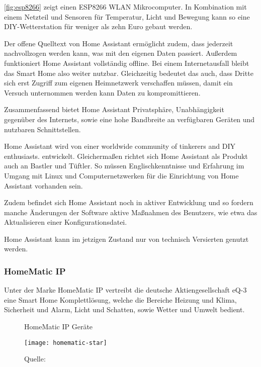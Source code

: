 \autoref{fig:esp8266} zeigt einen ESP8266 WLAN Mikrocomputer.
In Kombination mit einem Netzteil und Sensoren für Temperatur, Licht und Bewegung kann so eine \ac{DIY}-Wetterstation für weniger als zehn Euro gebaut werden.

Der offene Quelltext von Home Assistant ermöglicht zudem, dass jederzeit nachvollzogen werden kann, was mit den eigenen Daten passiert.
Außerdem funktioniert Home Assistant vollständig offline.
Bei einem Internetausfall bleibt das Smart Home also weiter nutzbar.
Gleichzeitig bedeutet das auch, dass Dritte sich erst Zugriff zum eigenen Heimnetzwerk verschaffen müssen, damit ein Versuch unternommen werden kann Daten zu kompromittieren.

Zusammenfassend bietet Home Assistant Privatsphäre, Unabhängigkeit gegenüber des Internets, sowie eine hohe Bandbreite an verfügbaren Geräten und nutzbaren Schnittstellen.

Home Assistant wird von einer \glqq worldwide community of tinkerers and DIY enthusiasts.\grqq{} entwickelt.
Gleichermaßen richtet sich Home Assistant als Produkt auch an Bastler und Tüftler.
So müssen Englischkenntnisse und Erfahrung im Umgang mit Linux und Computernetzwerken für die Einrichtung von Home Assistant vorhanden sein.

Zudem befindet sich Home Assistant noch in aktiver Entwicklung und so fordern manche Änderungen der Software aktive Maßnahmen des Benutzers, wie etwa das Aktualisieren einer Konfigurationsdatei.

Home Assistant kann im jetzigen Zustand nur von technisch Versierten genutzt werden.

\subsubsection{HomeMatic IP}

Unter der Marke HomeMatic IP vertreibt die deutsche Aktiengesellschaft eQ-3 eine Smart Home Komplettlösung, welche die Bereiche Heizung und Klima, Sicherheit und Alarm, Licht und Schatten, sowie Wetter und Umwelt bedient.

\begin{figure}[ht]
	\centering
	\caption{HomeMatic IP Geräte}
	\texttt{[image: homematic-star]}
	\caption*{\footnotesize{Quelle: }}
	\label{fig:homematic_star}
\end{figure}

